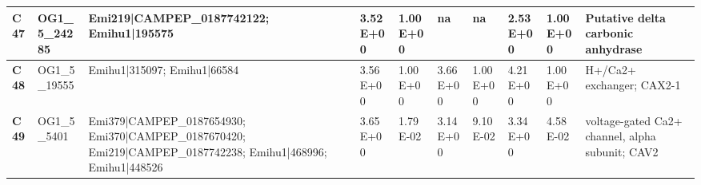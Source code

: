 \begin{landscape}
\begin{center}
\begin{footnotesize}
\begin{longtable}{|p{0.5cm}|p{1.5cm}|p{4cm}|l|l|l|l|l|l|l|}
\textbf{C47} & OG1\_5\_24285 & Emi219|CAMPEP\_0187742122; Emihu1|195575                                                                                                                                                                                                                                                                                                                                                                                                                                                                                                                                                                                                 & 3.52E+00  & 1.00E+00 & na        & na       & 2.53E+00  & 1.00E+00 & Putative delta carbonic anhydrase                                            \\ \hline
\textbf{C48} & OG1\_5\_19555 & Emihu1|315097; Emihu1|66584                                                                                                                                                                                                                                                                                                                                                                                                                                                                                                                                                                                                              & 3.56E+00  & 1.00E+00 & 3.66E+00  & 1.00E+00 & 4.21E+00  & 1.00E+00 & H+/Ca2+ exchanger; CAX2-1                                                    \\ \hline
\textbf{C49} & OG1\_5\_5401  & Emi379|CAMPEP\_0187654930; Emi370|CAMPEP\_0187670420; Emi219|CAMPEP\_0187742238; Emihu1|468996; Emihu1|448526                                                                                                                                                                                                                                                                                                                                                                                                                                                                                                                            & 3.65E+00  & 1.79E-02 & 3.14E+00  & 9.10E-02 & 3.34E+00  & 4.58E-02 & voltage-gated Ca2+ channel, alpha subunit; CAV2                              \\ \hline

\end{longtable}
\end{footnotesize}
\end{center}
\end{landscape}
